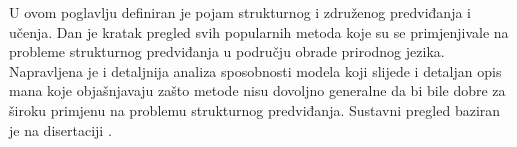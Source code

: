 U ovom poglavlju definiran je pojam strukturnog i združenog predviđanja i
učenja. Dan je kratak pregled svih popularnih metoda koje su se primjenjivale na
probleme strukturnog predviđanja u području obrade prirodnog jezika. Napravljena
je i detaljnija analiza sposobnosti modela koji slijede i detaljan opis mana
koje objašnjavaju zašto metode nisu dovoljno generalne da bi bile dobre za
široku primjenu na problemu strukturnog predviđanja. Sustavni pregled baziran je
na disertaciji \citep{daume06thesis}.
